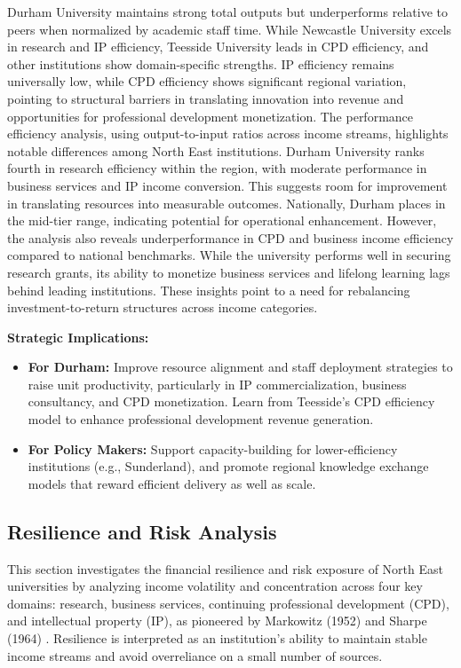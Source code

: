 \documentclass[journal,onecolumn, 10pt,draftclsnofoot]{IEEEtran}
\begin{document}
Durham University maintains strong total outputs but underperforms relative to peers when normalized by academic staff time. While Newcastle University excels in research and IP efficiency, Teesside University leads in CPD efficiency, and other institutions show domain-specific strengths. IP efficiency remains universally low, while CPD efficiency shows significant regional variation, pointing to structural barriers in translating innovation into revenue and opportunities for professional development monetization. The performance efficiency analysis, using output-to-input ratios across income streams, highlights notable differences among North East institutions. Durham University ranks fourth in research efficiency within the region, with moderate performance in business services and IP income conversion. This suggests room for improvement in translating resources into measurable outcomes. Nationally, Durham places in the mid-tier range, indicating potential for operational enhancement. However, the analysis also reveals underperformance in CPD and business income efficiency compared to national benchmarks. While the university performs well in securing research grants, its ability to monetize business services and lifelong learning lags behind leading institutions. These insights point to a need for rebalancing investment-to-return structures across income categories.

\textbf{Strategic Implications:}
\begin{itemize}
    \item \textbf{For Durham:} Improve resource alignment and staff deployment strategies to raise unit productivity, particularly in IP commercialization, business consultancy, and CPD monetization. Learn from Teesside's CPD efficiency model to enhance professional development revenue generation.
    
    \item \textbf{For Policy Makers:} Support capacity-building for lower-efficiency institutions (e.g., Sunderland), and promote regional knowledge exchange models that reward efficient delivery as well as scale.
\end{itemize}

\subsection{Resilience and Risk Analysis}
\label{sec:resilience-risk}

This section investigates the financial resilience and risk exposure of North East universities by analyzing income volatility and concentration across four key domains: research, business services, continuing professional development (CPD), and intellectual property (IP), as pioneered by Markowitz (1952) \cite{markowitz1952portfolio} and Sharpe (1964) \cite{sharpe1964capital}. Resilience is interpreted as an institution's ability to maintain stable income streams and avoid overreliance on a small number of sources.
\end{document}
